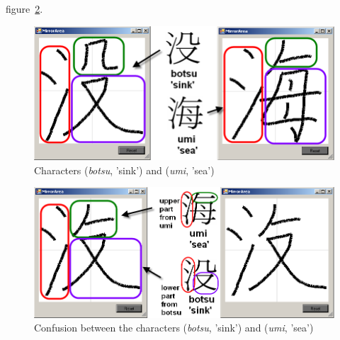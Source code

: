 figure~\ref{fig:eval:hybrid935and117}.
\begin{figure}[htbp]
  \begin{center}
    \includegraphics[scale=0.72]{images/char935vsChar117HandwrittenMarked.png}
    \caption{Characters  (\emph{botsu}, 'sink') and  (\emph{umi}, 'sea')}
    \label{fig:eval:botsuumiprintvsdrawn}
  \end{center}
\end{figure}
\begin{figure}[thbp]
  \begin{center}
    \includegraphics[scale=0.55]{images/char935and117HybridMarked.png}
    \caption{Confusion between the characters  (\emph{botsu}, 'sink') and  (\emph{umi}, 'sea')}
    \label{fig:eval:hybrid935and117}
  \end{center}
\end{figure}

